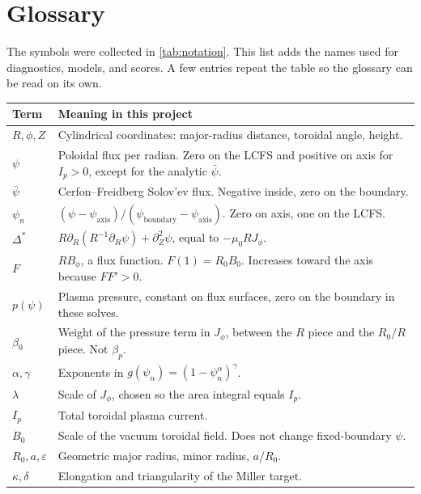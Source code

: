 \documentclass[11pt,a4paper,oneside,openany]{book}
\numberwithin{equation}{chapter}
\newcommand{\Dstar}{\Delta^{*}}
\newcommand{\psin}{\psi_{n}}
\newcommand{\psibar}{\bar{\psi}}
\newcommand{\Ip}{I_{p}}
\theoremstyle{definition}
\begin{document}
\backmatter

\chapter{Glossary}

The symbols were collected in \cref{tab:notation}. This list adds the names used for diagnostics, models, and scores. A few entries repeat the table so the glossary can be read on its own.

\small
\begin{longtable}{@{}>{\raggedright\arraybackslash}p{} >{\raggedright\arraybackslash}p{}@{}}
\toprule
Term & Meaning in this project \\
\midrule
\endhead
\bottomrule
\endfoot
\(R,\phi,Z\) & Cylindrical coordinates: major-radius distance, toroidal angle, height. \\
\(\psi\) & Poloidal flux per radian. Zero on the LCFS and positive on axis for \(\Ip>0\), except for the analytic \(\psibar\). \\
\(\psibar\) & Cerfon--Freidberg Solov'ev flux. Negative inside, zero on the boundary. \\
\(\psin\) & \((\psi-\psi_{\mathrm{axis}})/(\psi_{\mathrm{boundary}}-\psi_{\mathrm{axis}})\). Zero on axis, one on the LCFS. \\
\(\Dstar\) & \(R\partial_{R}(R^{-1}\partial_{R}\psi)+\partial_{Z}^{2}\psi\), equal to \(-\mu_{0} R J_{\phi}\). \\
\(F\) & \(RB_{\phi}\), a flux function. \(F(1)=R_{0} B_{0}\). Increases toward the axis because \(FF'>0\). \\
\(p(\psi)\) & Plasma pressure, constant on flux surfaces, zero on the boundary in these solves. \\
\(\beta_{0}\) & Weight of the pressure term in \(J_{\phi}\), between the \(R\) piece and the \(R_{0}/R\) piece. Not \(\beta_{p}\). \\
\(\alpha,\gamma\) & Exponents in \(g(\psin)=(1-\psin^{\alpha})^{\gamma}\). \\
\(\lambda\) & Scale of \(J_{\phi}\), chosen so the area integral equals \(\Ip\). \\
\(\Ip\) & Total toroidal plasma current. \\
\(B_{0}\) & Scale of the vacuum toroidal field. Does not change fixed-boundary \(\psi\). \\
\(R_{0},a,\varepsilon\) & Geometric major radius, minor radius, \(a/R_{0}\). \\
\(\kappa,\delta\) & Elongation and triangularity of the Miller target. \\

\end{longtable}
\end{document}
